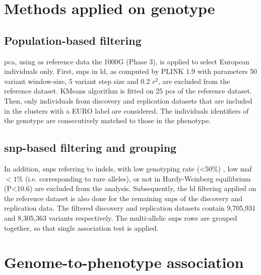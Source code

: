 \section{Methods applied on genotype}
\subsection{Population-based filtering}
\ac{pca}, using as reference data the 1000G (Phase 3), is applied to select European individuals only. First, \acp{snp} in \ac{ld}, as computed by PLINK 1.9 with parameters 50 variant window-size, 5 variant step size and 0.2 $r^2$, are excluded from the reference dataset. KMeans algorithm is fitted on 25 \acp{pc} of the reference dataset. Then, only individuals from discovery and replication datasets that are included in the clusters with a EURO label are considered. The individuals identifiers of the genotype are consecutively matched to those in the phenotype.

\subsection{\acs{snp}-based filtering and grouping}
\label{sub:snpbased_filt}
 In addition, \acp{snp} referring to indels, with low genotyping rate (<50\%) , low \ac{maf} $<1\%$ (i.e. corresponding to rare alleles), or not in Hardy-Weinberg equilibrium (P<10.6) are excluded from the analysis. Subsequently, the \ac{ld} filtering applied on the reference dataset is also done for the remaining \acp{snp} of the discovery and replication data. The filtered discovery and replication datasets contain 9,705,931 and 8,305,363 variants respectively. The multi-allelic \acp{snp} rows are grouped together, so that single association test is applied.

\section{Genome-to-phenotype association}
